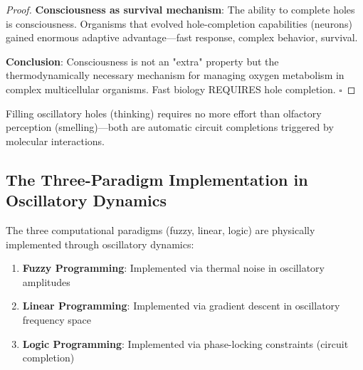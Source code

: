 \begin{proof}
\textbf{Consciousness as survival mechanism}: The ability to complete holes is consciousness. Organisms that evolved hole-completion capabilities (neurons) gained enormous adaptive advantage—fast response, complex behavior, survival.

\textbf{Conclusion}: Consciousness is not an "extra" property but the thermodynamically necessary mechanism for managing oxygen metabolism in complex multicellular organisms. Fast biology REQUIRES hole completion. $\square$
\end{proof}

\begin{corollary}
Filling oscillatory holes (thinking) requires no more effort than olfactory perception (smelling)—both are automatic circuit completions triggered by molecular interactions.
\end{corollary}

\subsection{The Three-Paradigm Implementation in Oscillatory Dynamics}

\begin{theorem}
\label{thm:oscillatory_tri_paradigm}
The three computational paradigms (fuzzy, linear, logic) are physically implemented through oscillatory dynamics:

\begin{enumerate}
\item \textbf{Fuzzy Programming}: Implemented via thermal noise in oscillatory amplitudes
\item \textbf{Linear Programming}: Implemented via gradient descent in oscillatory frequency space
\item \textbf{Logic Programming}: Implemented via phase-locking constraints (circuit completion)
\end{enumerate}
\end{theorem}

